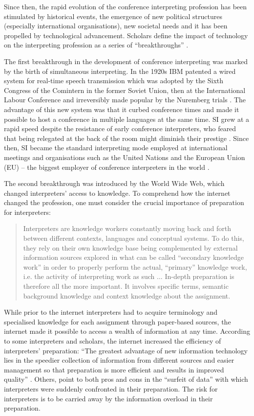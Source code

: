 Since then, the rapid evolution of the conference interpreting profession has been stimulated by historical events, the emergence of new political structures (especially international organisations), new societal needs and it has been propelled by technological advancement. Scholars define the impact of technology on the interpreting profession as a series of ``breakthroughs'' \citep{fantinuoli2018a,tripepi2010usefulness}.

The first breakthrough in the development of conference interpreting was marked by the birth of simultaneous interpreting. In the 1920s IBM patented a wired system for real-time speech transmission which was adopted by the Sixth Congress of the Comintern in the former Soviet Union, then at the International Labour Conference and irreversibly made popular by the Nuremberg trials \citep{fantinuoli2018a}. The advantage of this new system was that it curbed conference times and made it possible to host a conference in multiple languages at the same time. SI grew at a rapid speed despite the resistance of early conference interpreters, who feared that being relegated at the back of the room might diminish their prestige \citep{fantinuoli2018a}. Since then, SI became the standard interpreting mode employed at international meetings and organisations such as the United Nations and the European Union (EU)  --  the biggest employer of conference interpreters in the world \citep{european2016}.

The second breakthrough was introduced by the World Wide Web, which changed interpreters’ access to knowledge. To comprehend how the internet changed the profession, one must consider the crucial importance of preparation for interpreters:

\begin{quote}
    Interpreters are knowledge workers constantly moving back and forth between different contexts, languages and conceptual systems. To do this, they rely on their own knowledge base being complemented by external information sources explored in what can be called ``secondary knowledge work'' in order to properly perform the actual, ``primary'' knowledge work, i.e. the activity of interpreting work as such ... In-depth preparation is therefore all the more important. It involves specific terms, semantic background knowledge and context knowledge about the assignment. \citep{rutten2016professional}
\end{quote}
While prior to the internet interpreters had to acquire terminology and specialised knowledge for each assignment through paper-based sources, the internet made it possible to access a wealth of information at any time. According to some interpreters and scholars, the internet increased the efficiency of interpreters’ preparation: ``The greatest advantage of new information technology lies in the speedier collection of information from different sources and easier management so that preparation is more efficient and results in improved quality'' \citep[81]{kalina2010new}. Others, point to both pros and cons in the ``surfeit of data'' \citep{donovan2006interpreting} with which interpreters were suddenly confronted in their preparation. The risk for interpreters is to be carried away by the information overload in their preparation.

